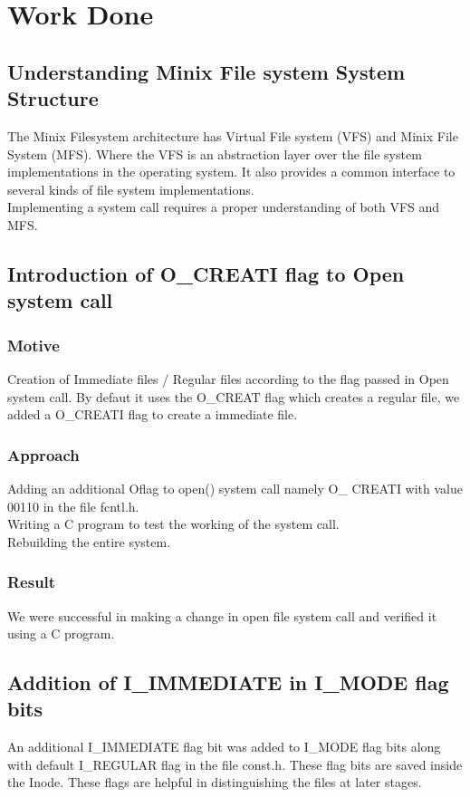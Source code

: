 \chapter{Work Done}

\section{Understanding Minix File system System Structure}

The Minix Filesystem architecture has Virtual File system (VFS) and Minix File System (MFS). Where the VFS is an abstraction layer over the file system implementations in the operating system. It also provides a common interface to several kinds of file system implementations. \\
Implementing a system call requires a proper understanding of both VFS and MFS.

\section{Introduction of O\_CREATI flag to Open system call}
\subsection{Motive}
Creation of Immediate files / Regular files according to the flag passed in Open system call. By defaut it uses the O\_CREAT flag which creates a regular file, we added a O\_CREATI flag to create a immediate file.
\subsection{Approach}
Adding an additional Oflag to open() system call namely O\_ CREATI  with value 00110 in the file fcntl.h. \\	
Writing a C program to test the working of the system call.\\
Rebuilding the entire system.
\subsection{Result}
We were successful in making a change in open file system call and verified it using a C program.

\section{Addition of I\_IMMEDIATE in I\_MODE flag bits }
An additional I\_IMMEDIATE flag bit was added to I\_MODE flag bits along with default I\_REGULAR flag in the file const.h. These flag bits are saved inside the Inode. These flags are helpful in distinguishing the files at later stages. 